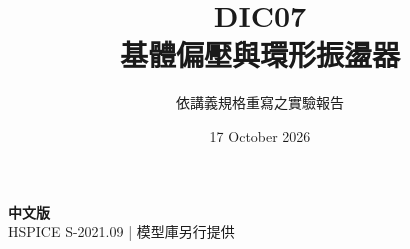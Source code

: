 \documentclass[11pt,a4paper]{article}
\title{\color{accent}DIC07\\[4pt]基體偏壓與環形振盪器}
\author{依講義規格重寫之實驗報告}
\date{17 October 2026}
\begin{document}
\maketitle
\begin{center}\small\textbf{中文版}\\
HSPICE S-2021.09 \quad | \quad 模型庫另行提供
\end{center}


\end{document}
